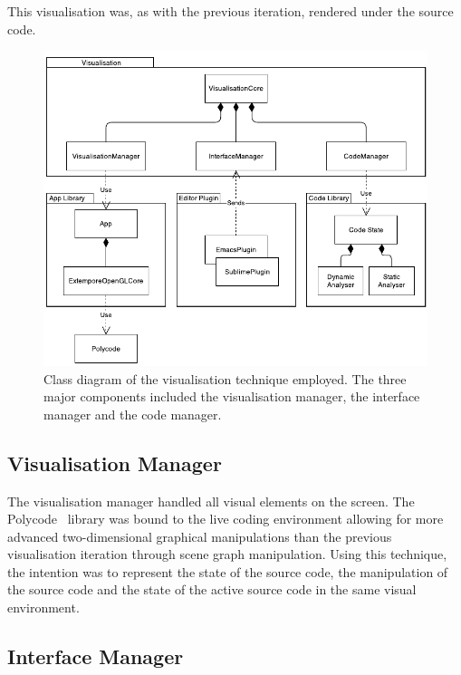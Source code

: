This visualisation was, as with the previous iteration, rendered under the source code. 


\begin{figure}
  \centering \includegraphics[width=\columnwidth]{../images/diagrams/visualisation-class-diagram.pdf}
  \caption[Prototype (second iteration) class diagram]{Class diagram of the visualisation technique employed. The three major components included the visualisation manager, the interface manager and the code manager.}
\label{fig:visualisation-class-diagram}
\end{figure}

\subsection{Visualisation Manager}

The visualisation manager handled all visual elements on the screen. The Polycode~\cite{Safrin2013} library was bound to the live coding environment allowing for more advanced two-dimensional graphical manipulations than the previous visualisation iteration through scene graph manipulation. Using this technique, the intention was to represent the state of the source code, the manipulation of the source code and the state of the active source code in the same visual environment.

\subsection{Interface Manager}
\label{sec:interface-manager}

